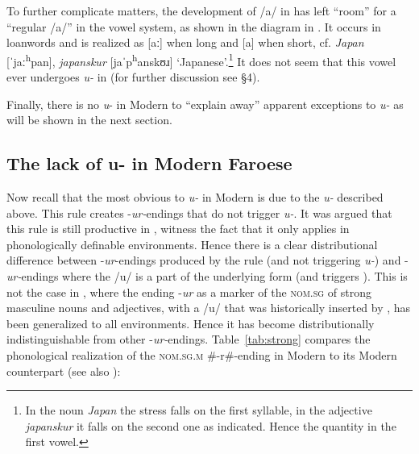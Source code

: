 \documentclass[output=paper,
modfonts
]{LSP/langsci}
\begin{document}
\begin{exe}
To further complicate matters, the development of  /a/ in
 has left ``room'' for a ``regular /a/'' in the  vowel
system, as shown in the diagram in . It occurs in loanwords and is
realized as {[}aː{]} when long and {[}a{]} when short, cf. \emph{Japan}
{[}ˈjaː\textsuperscript{h}pan{]}, \emph{japanskur}
{[}jaˈp\textsuperscript{h}anskʊɹ{]} `Japanese'.\footnote{In the noun
  \emph{Japan} the stress falls on the first syllable, in the adjective
  \emph{japanskur} it falls on the second one as indicated. Hence the
  quantity  in the first vowel.} It does not seem that this
vowel ever undergoes \emph{u-} in  (for further discussion
see \S4).

Finally, there is no \emph{u}- in Modern  to ``explain
away'' apparent exceptions to \emph{u-} as will be shown in the
next section.

\subsection{The lack of {u-} in Modern Faroese}

Now recall that the most obvious  to \emph{u-} in
Modern  is due to the \emph{u-} described above. This
rule creates -\emph{ur-}endings that do not trigger \emph{u-}. It
was argued that this  rule is still productive in ,
witness the fact that it only applies in phonologically definable
environments. Hence there is a clear distributional difference between
-\emph{ur}-endings produced by the  rule (and not triggering
\emph{u-}) and -\emph{ur-}endings where the /u/ is a part of the
underlying form (and triggers ). This is not the case in ,
where the ending -\emph{ur} as a marker of the \textsc{nom.sg} of strong
masculine nouns and adjectives, with a /u/ that was historically
inserted by , has been generalized to all environments. Hence
it has become distributionally indistinguishable from other
-\emph{ur-}endings. Table~\ref{tab:strong} compares the phonological realization of the
\textsc{nom.sg.m} \#-r\#-ending in Modern  to its Modern
 counterpart (see also \citealt[100]{thrainsson2011}):


\end{exe}
\end{document}
